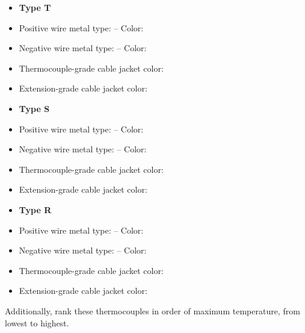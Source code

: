 \begin{itemize}
\item{} {\bf Type T}
\item{} Positive wire metal type: \underbar{\hskip 50pt} -- Color: \underbar{\hskip 50pt} 
\item{} Negative wire metal type: \underbar{\hskip 50pt} -- Color: \underbar{\hskip 50pt} 
\item{} Thermocouple-grade cable jacket color: \underbar{\hskip 50pt} 
\item{} Extension-grade cable jacket color: \underbar{\hskip 50pt} 
\end{itemize}

\begin{itemize}
\item{} {\bf Type S}
\item{} Positive wire metal type: \underbar{\hskip 50pt} -- Color: \underbar{\hskip 50pt} 
\item{} Negative wire metal type: \underbar{\hskip 50pt} -- Color: \underbar{\hskip 50pt} 
\item{} Thermocouple-grade cable jacket color: \underbar{\hskip 50pt} 
\item{} Extension-grade cable jacket color: \underbar{\hskip 50pt} 
\end{itemize}

\begin{itemize}
\item{} {\bf Type R}
\item{} Positive wire metal type: \underbar{\hskip 50pt} -- Color: \underbar{\hskip 50pt} 
\item{} Negative wire metal type: \underbar{\hskip 50pt} -- Color: \underbar{\hskip 50pt} 
\item{} Thermocouple-grade cable jacket color: \underbar{\hskip 50pt} 
\item{} Extension-grade cable jacket color: \underbar{\hskip 50pt} 
\end{itemize}

\vskip 10pt

Additionally, rank these thermocouples in order of maximum temperature, from lowest to highest.

